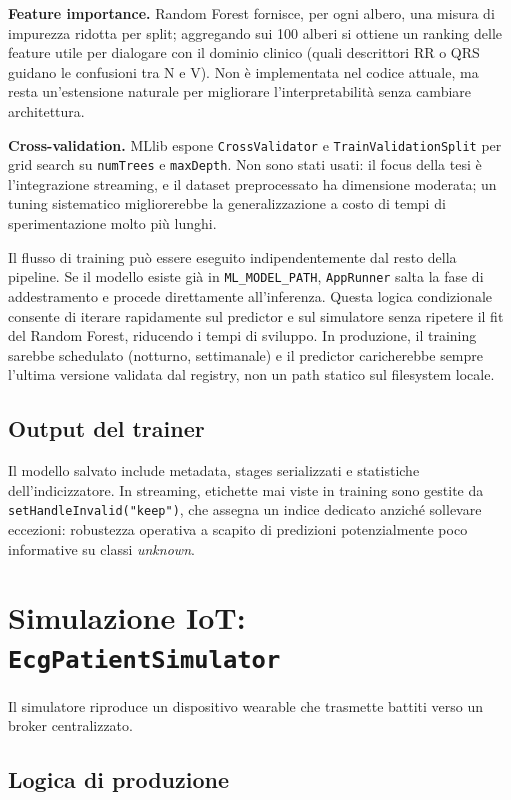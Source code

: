 \textbf{Feature importance.} Random Forest fornisce, per ogni albero, una misura di impurezza ridotta per split; aggregando sui 100 alberi si ottiene un ranking delle feature utile per dialogare con il dominio clinico (quali descrittori RR o QRS guidano le confusioni tra N e V).
Non è implementata nel codice attuale, ma resta un'estensione naturale per migliorare l'interpretabilità senza cambiare architettura.

\textbf{Cross-validation.} MLlib espone \texttt{CrossValidator} e \texttt{TrainValidationSplit} per grid search su \texttt{numTrees} e \texttt{maxDepth}.
Non sono stati usati: il focus della tesi è l'integrazione streaming, e il dataset preprocessato ha dimensione moderata; un tuning sistematico migliorerebbe la generalizzazione a costo di tempi di sperimentazione molto più lunghi.

Il flusso di training può essere eseguito indipendentemente dal resto della pipeline.
Se il modello esiste già in \texttt{ML\_MODEL\_PATH}, \texttt{AppRunner} salta la fase di addestramento e procede direttamente all'inferenza.
Questa logica condizionale consente di iterare rapidamente sul predictor e sul simulatore senza ripetere il fit del Random Forest, riducendo i tempi di sviluppo.
In produzione, il training sarebbe schedulato (notturno, settimanale) e il predictor caricherebbe sempre l'ultima versione validata dal registry, non un path statico sul filesystem locale.

\subsection{Output del trainer}

Il modello salvato include metadata, stages serializzati e statistiche dell'indicizzatore.
In streaming, etichette mai viste in training sono gestite da \texttt{setHandleInvalid("keep")}, che assegna un indice dedicato anziché sollevare eccezioni: robustezza operativa a scapito di predizioni potenzialmente poco informative su classi \emph{unknown}.

\section{Simulazione IoT: \texttt{EcgPatientSimulator}}\label{sec:ecg-patient-simulator}

Il simulatore riproduce un dispositivo wearable che trasmette battiti verso un broker centralizzato.

\subsection{Logica di produzione}

